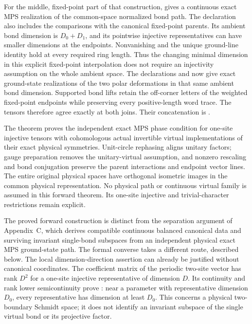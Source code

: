 \documentclass{article}
\begin{document}
For the middle, fixed-point part of that construction,
gives a continuous exact MPS realization of the common-space normalized bond
path. The declaration
also includes the comparisons with the canonical fixed-point parents.
Its ambient bond dimension is $D_0+D_1$, and its pointwise injective
representatives can have smaller dimensions at the endpoints. Nonvanishing
and the unique ground-line identity hold at every required ring length.
Thus the changing minimal dimension in this explicit fixed-point
interpolation does not require an injectivity assumption on the whole ambient
space. The declarations
 and
now give exact ground-state realizations of the two polar deformations in
that same ambient bond dimension. Supported bond lifts retain the
off-corner letters of the weighted fixed-point endpoints while preserving
every positive-length word trace. The tensors therefore agree exactly at
both joins. Their concatenation is
.

The theorem
proves the independent exact MPS phase condition for one-site injective
tensors with cohomologous actual invertible virtual implementations of
their exact physical symmetries. Unit-circle rephasing aligns unitary factors;
gauge preparation removes the unitary-virtual assumption, and nonzero
rescaling and bond conjugation preserve the parent interactions and endpoint
vector lines. The entire original physical spaces have orthogonal isometric
images in the common physical representation. No physical path or continuous
virtual family is assumed in this forward theorem. Its one-site injective
and trivial-character restrictions remain explicit.

The proved forward construction is distinct from the separation argument
of Appendix~C, which derives compatible continuous balanced canonical data and
surviving invariant single-bond subspaces from an independent physical exact
MPS ground-state path. The formal converse takes a different route, described
below. The local
dimension-direction assertion can already be justified without canonical
coordinates. The coefficient matrix of the periodic two-site vector has
rank $D^2$ for a one-site injective representative of dimension $D$.
Its continuity and rank lower semicontinuity prove
:
near a parameter with representative dimension $D_0$, every representative
has dimension at least $D_0$. This concerns a physical two-boundary Schmidt
space; it does not identify an invariant subspace of the single virtual
bond or its projective factor.
\end{document}
